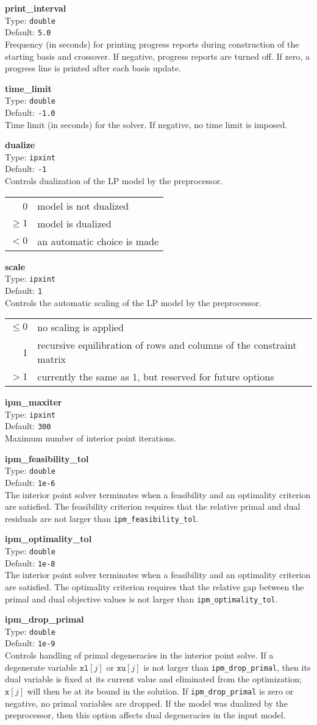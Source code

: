 \documentclass{article}
\newcommand{\ct}{\texttt}
\newcommand{\param}[4]{
  \noindent\begin{minipage}{\textwidth}
    \textbf{#1}\\
    Type: \ct{#2}\\
    Default: \ct{#3}\\
    #4
  \end{minipage}
  \vskip 1\baselineskip
}
\newcommand{\x}{\ct{x}}
\newcommand{\xl}{\ct{xl}}
\newcommand{\xu}{\ct{xu}}
\begin{document}
\param{print\_interval}{double}{5.0}{
  Frequency (in seconds) for printing progress reports during construction of
  the starting basis and crossover. If negative, progress reports are turned
  off. If zero, a progress line is printed after each basis update.
}

\param{time\_limit}{double}{-1.0}{
  Time limit (in seconds) for the solver. If negative, no time limit is
  imposed.
}

\param{dualize}{ipxint}{-1}{
  Controls dualization of the LP model by the preprocessor. \\
  \begin{tabular}{rl}
    0 & model is not dualized \\
    $\ge1$ & model is dualized \\
    $<0$ & an automatic choice is made
  \end{tabular}
}

\param{scale}{ipxint}{1}{
  Controls the automatic scaling of the LP model by the preprocessor. \\
  \begin{tabular}{rl}
    $\le0$ & no scaling is applied \\
    1 & recursive equilibration of rows and columns of the constraint matrix \\
    $>1$ & currently the same as 1, but reserved for future options
  \end{tabular}
}

\param{ipm\_maxiter}{ipxint}{300}{
  Maximum number of interior point iterations.
}

\param{ipm\_feasibility\_tol}{double}{1e-6}{
  The interior point solver terminates when a feasibility and an optimality
  criterion are satisfied. The feasibility criterion requires that the relative
  primal and dual residuals are not larger than \ct{ipm\_feasibility\_tol}.
}

\param{ipm\_optimality\_tol}{double}{1e-8}{
  The interior point solver terminates when a feasibility and an optimality
  criterion are satisfied. The optimality criterion requires that the relative
  gap between the primal and dual objective values is not larger than
  \ct{ipm\_optimality\_tol}.
}

\param{ipm\_drop\_primal}{double}{1e-9}{
  Controls handling of primal degeneracies in the interior point solve. If a
  degenerate variable $\xl[j]$ or $\xu[j]$ is not larger than
  \ct{ipm\_drop\_primal}, then its dual variable is fixed at its current value
  and eliminated from the optimization; $\x[j]$ will then be at its bound in the
  solution. If \ct{ipm\_drop\_primal} is zero or negative, no primal variables
  are dropped. If the model was dualized by the preprocessor, then this option
  affects dual degeneracies in the input model.
}
\end{document}
